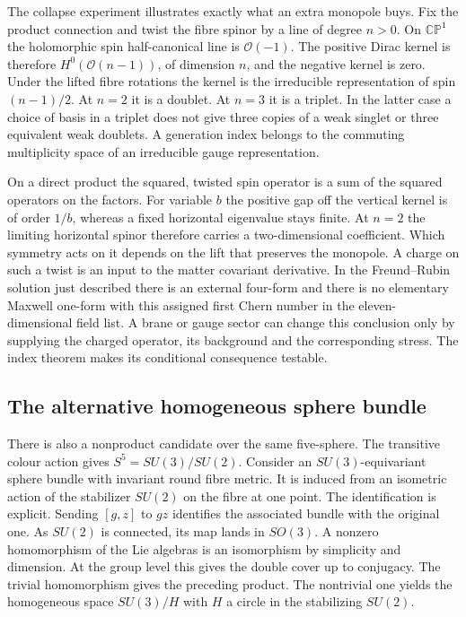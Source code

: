 \documentclass[aps,prd,reprint,onecolumn,nofootinbib,amsmath,amssymb]{revtex4-2}
\begin{document}
The collapse experiment illustrates exactly what an extra monopole buys. Fix the product connection and twist the fibre spinor by a line of degree $n>0$. On $\mathbb{CP}^1$ the holomorphic spin half-canonical line is $\mathcal O(-1)$. The positive Dirac kernel is therefore $H^0(\mathcal O(n-1))$, of dimension $n$, and the negative kernel is zero. Under the lifted fibre rotations the kernel is the irreducible representation of spin $(n-1)/2$. At $n=2$ it is a doublet. At $n=3$ it is a triplet. In the latter case a choice of basis in a triplet does not give three copies of a weak singlet or three equivalent weak doublets. A generation index belongs to the commuting multiplicity space of an irreducible gauge representation.

On a direct product the squared, twisted spin operator is a sum of the squared operators on the factors. For variable $b$ the positive gap off the vertical kernel is of order $1/b$, whereas a fixed horizontal eigenvalue stays finite. At $n=2$ the limiting horizontal spinor therefore carries a two-dimensional coefficient. Which symmetry acts on it depends on the lift that preserves the monopole. A charge on such a twist is an input to the matter covariant derivative. In the Freund--Rubin solution just described there is an external four-form and there is no elementary Maxwell one-form with this assigned first Chern number in the eleven-dimensional field list. A brane or gauge sector can change this conclusion only by supplying the charged operator, its background and the corresponding stress. The index theorem makes its conditional consequence testable.

\subsection{The alternative homogeneous sphere bundle}
There is also a nonproduct candidate over the same five-sphere. The transitive colour action gives $S^5=SU(3)/SU(2)$. Consider an $SU(3)$-equivariant sphere bundle with invariant round fibre metric. It is induced from an isometric action of the stabilizer $SU(2)$ on the fibre at one point. The identification is explicit. Sending $[g,z]$ to $g z$ identifies the associated bundle with the original one. As $SU(2)$ is connected, its map lands in $SO(3)$. A nonzero homomorphism of the Lie algebras is an isomorphism by simplicity and dimension. At the group level this gives the double cover up to conjugacy. The trivial homomorphism gives the preceding product. The nontrivial one yields the homogeneous space $SU(3)/H$ with $H$ a circle in the stabilizing $SU(2)$.
\end{document}
